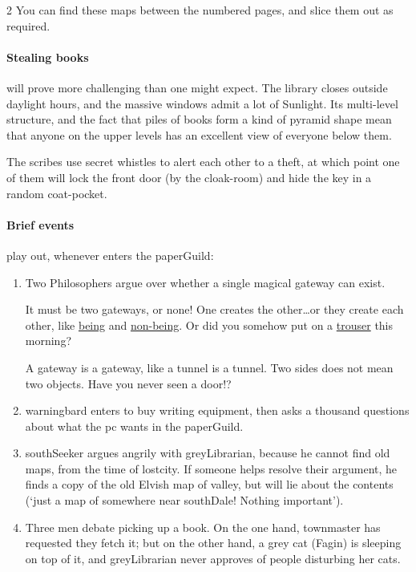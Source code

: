 \begin{multicols}{2}
You can find these maps between the numbered pages, and slice them out as required.

\paragraph{Stealing books}
will prove more challenging than one might expect.
The library closes outside daylight hours, and the massive windows admit a lot of Sunlight.
Its multi-level structure, and the fact that piles of books form a kind of pyramid shape mean that anyone on the upper levels has an excellent view of everyone below them.

The \glspl{scribe} use secret whistles to alert each other to a theft, at which point one of them will lock the front door (by the cloak-room) and hide the key in a random coat-pocket.

\paragraph{Brief events}
play out, whenever  enters the \gls{paperGuild}:

\begin{enumerate}
  \item
  Two Philosophers argue over whether a single magical gateway can exist.
  \begin{speechtext}
    \raggedright
    It must be two gateways, or none!
    One creates the other\ldots or they create each other, like \underline{being} and \underline{non-being}.
    Or did you somehow put on a \underline{trouser} this morning?

    \bigLine
    \flushright\raggedleft
    A gateway is a gateway, like a tunnel is a tunnel.
    Two sides does not mean two objects.
    Have you never seen a door!?
  \end{speechtext}
  \item
  \Gls{warningbard} enters to buy writing equipment, then asks a thousand questions about what the \gls{pc} wants in the \gls{paperGuild}.
  \item
  \Gls{southSeeker} argues angrily with \gls{greyLibrarian}, because he cannot find old maps, from the time of \gls{lostcity}.
  If someone helps resolve their argument, he finds a copy of the old Elvish map of \gls{valley}, but will lie about the contents (`just a map of somewhere near \gls{southDale}! Nothing important').
  \item
  Three men debate picking up a book.
  On the one hand, \gls{townmaster} has requested they fetch it; but on the other hand, a grey cat (Fagin) is sleeping on top of it, and \gls{greyLibrarian} never approves of people disturbing her cats.


\end{enumerate}
\end{multicols}
